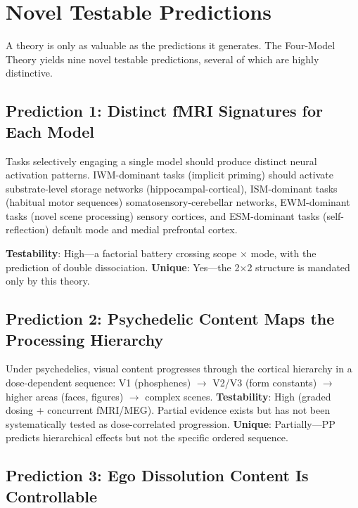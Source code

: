 \documentclass[12pt]{article}
\begin{document}
\section{Novel Testable Predictions}

A theory is only as valuable as the predictions it generates. The Four-Model Theory yields nine novel testable predictions, several of which are highly distinctive.


\subsection{Prediction 1: Distinct fMRI Signatures for Each Model}

Tasks selectively engaging a single model should produce distinct neural activation patterns. IWM-dominant tasks (implicit priming) should activate substrate-level storage networks (hippocampal-cortical), ISM-dominant tasks (habitual motor sequences) somatosensory-cerebellar networks, EWM-dominant tasks (novel scene processing) sensory cortices, and ESM-dominant tasks (self-reflection) default mode and medial prefrontal cortex.

\textbf{Testability}: High---\hspace{0pt}a factorial battery crossing scope $\times$ mode, with the prediction of double dissociation. \textbf{Unique}: Yes---\hspace{0pt}the 2$\times$2 structure is mandated only by this theory.


\subsection{Prediction 2: Psychedelic Content Maps the Processing Hierarchy}

Under psychedelics, visual content progresses through the cortical hierarchy in a dose-dependent sequence: V1 (phosphenes) $\to$ V2/V3 (form constants) $\to$ higher areas (faces, figures) $\to$ complex scenes. \textbf{Testability}: High (graded dosing + concurrent fMRI/MEG). Partial evidence exists \citep{CarhartHarris2016,Timmermann2023} but has not been systematically tested as dose-correlated progression. \textbf{Unique}: Partially---\hspace{0pt}PP predicts hierarchical effects but not the specific ordered sequence.


\subsection{Prediction 3: Ego Dissolution Content Is Controllable}
\end{document}

